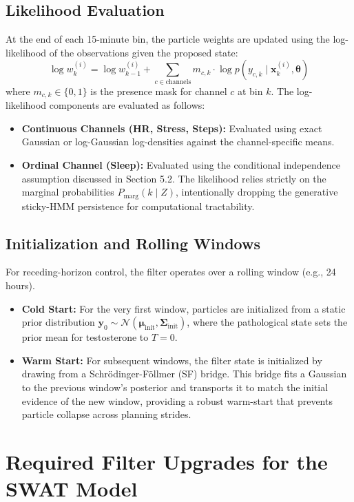\documentclass[11pt,a4paper]{article}
\begin{document}
\subsection{Likelihood Evaluation}
At the end of each 15-minute bin, the particle weights are updated using the log-likelihood of the observations given the proposed state:
\[
\log w_k^{(i)} = \log w_{k-1}^{(i)} + \sum_{c \in \text{channels}} m_{c,k} \cdot \log p(y_{c,k} \mid \mathbf{x}_k^{(i)}, \boldsymbol{\theta})
\]
where $m_{c,k} \in \{0, 1\}$ is the presence mask for channel $c$ at bin $k$. The log-likelihood components are evaluated as follows:
\begin{itemize}
    \item \textbf{Continuous Channels (HR, Stress, Steps):} Evaluated using exact Gaussian or log-Gaussian log-densities against the channel-specific means.
    \item \textbf{Ordinal Channel (Sleep):} Evaluated using the conditional independence assumption discussed in Section 5.2. The likelihood relies strictly on the marginal probabilities $P_{\text{marg}}(k \mid Z)$, intentionally dropping the generative sticky-HMM persistence for computational tractability.
\end{itemize}

\subsection{Initialization and Rolling Windows}
For receding-horizon control, the filter operates over a rolling window (e.g., 24 hours). 
\begin{itemize}
    \item \textbf{Cold Start:} For the very first window, particles are initialized from a static prior distribution $\mathbf{y}_0 \sim \mathcal{N}(\boldsymbol{\mu}_{\text{init}}, \boldsymbol{\Sigma}_{\text{init}})$, where the pathological state sets the prior mean for testosterone to $T=0$.
    \item \textbf{Warm Start:} For subsequent windows, the filter state is initialized by drawing from a Schr\"odinger-F\"ollmer (SF) bridge. This bridge fits a Gaussian to the previous window's posterior and transports it to match the initial evidence of the new window, providing a robust warm-start that prevents particle collapse across planning strides.
\end{itemize}

\section{Required Filter Upgrades for the SWAT Model}
\end{document}
